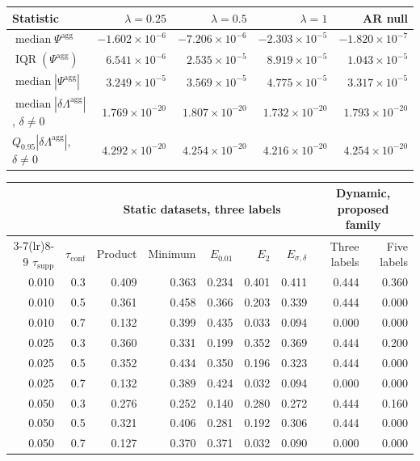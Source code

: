 \begin{table}
\label{tab:dynamic}
\begin{tabular}{lrrrr}
\toprule
Statistic & $\lambda=0.25$ & $\lambda=0.5$ & $\lambda=1$ & AR null \\
\midrule
$\operatorname{median}\Psi^{\mathrm{agg}}$ & $-1.602\times10^{-6}$ & $-7.206\times10^{-6}$ & $-2.303\times10^{-5}$ & $-1.820\times10^{-7}$ \\
$\operatorname{IQR}(\Psi^{\mathrm{agg}})$ & $6.541\times10^{-6}$ & $2.535\times10^{-5}$ & $8.919\times10^{-5}$ & $1.043\times10^{-5}$ \\
$\operatorname{median}|\Psi^{\mathrm{agg}}|$ & $3.249\times10^{-5}$ & $3.569\times10^{-5}$ & $4.775\times10^{-5}$ & $3.317\times10^{-5}$ \\
$\operatorname{median}|\delta\Lambda^{\mathrm{agg}}|$, $\delta\neq0$ & $1.769\times10^{-20}$ & $1.807\times10^{-20}$ & $1.732\times10^{-20}$ & $1.793\times10^{-20}$ \\
$Q_{0.95}|\delta\Lambda^{\mathrm{agg}}|$, $\delta\neq0$ & $4.292\times10^{-20}$ & $4.254\times10^{-20}$ & $4.216\times10^{-20}$ & $4.254\times10^{-20}$ \\
\bottomrule
\end{tabular}
\end{table}

\begin{table}
\label{tab:selection-thresholds}
\begin{tabular}{rrrrrrrrr}
\toprule
& & \multicolumn{5}{c}{Static datasets, three labels}
& \multicolumn{2}{c}{Dynamic, proposed family} \\
\cmidrule(lr){3-7}\cmidrule(lr){8-9}
$\tau_{\mathrm{supp}}$ & $\tau_{\mathrm{conf}}$
& Product & Minimum & $E_{0.01}$ & $E_2$ & $E_{\sigma,\delta}$
& Three labels & Five labels \\
\midrule
0.010 & 0.3 & 0.409 & 0.363 & 0.234 & 0.401 & 0.411 & 0.444 & 0.360 \\
0.010 & 0.5 & 0.361 & 0.458 & 0.366 & 0.203 & 0.339 & 0.444 & 0.000 \\
0.010 & 0.7 & 0.132 & 0.399 & 0.435 & 0.033 & 0.094 & 0.000 & 0.000 \\
0.025 & 0.3 & 0.360 & 0.331 & 0.199 & 0.352 & 0.369 & 0.444 & 0.200 \\
0.025 & 0.5 & 0.352 & 0.434 & 0.350 & 0.196 & 0.323 & 0.444 & 0.000 \\
0.025 & 0.7 & 0.132 & 0.389 & 0.424 & 0.032 & 0.094 & 0.000 & 0.000 \\
0.050 & 0.3 & 0.276 & 0.252 & 0.140 & 0.280 & 0.272 & 0.444 & 0.160 \\
0.050 & 0.5 & 0.321 & 0.406 & 0.281 & 0.192 & 0.306 & 0.444 & 0.000 \\
0.050 & 0.7 & 0.127 & 0.370 & 0.371 & 0.032 & 0.090 & 0.000 & 0.000 \\
\bottomrule
\end{tabular}
\end{table}

